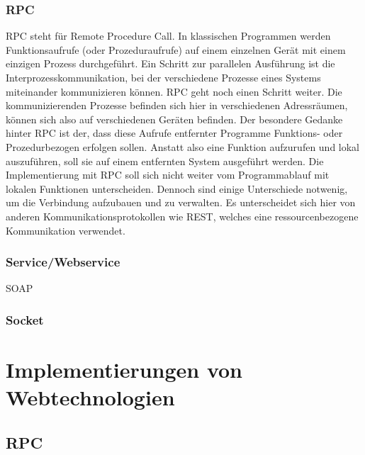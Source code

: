 \documentclass[a4paper,10pt]{article}
\numberwithin{figure}{section}
\numberwithin{table}{section}
\begin{document}
\subsubsection{RPC}

RPC steht für Remote Procedure Call.
In klassischen Programmen werden Funktionsaufrufe (oder Prozeduraufrufe) auf einem einzelnen Gerät mit einem einzigen Prozess durchgeführt.
Ein Schritt zur parallelen Ausführung ist die Interprozesskommunikation, bei der verschiedene Prozesse eines Systems miteinander kommunizieren können.
RPC geht noch einen Schritt weiter.
Die kommunizierenden Prozesse befinden sich hier in verschiedenen Adressräumen, können sich also auf verschiedenen Geräten befinden.
Der besondere Gedanke hinter RPC ist der, dass diese Aufrufe entfernter Programme Funktions- oder Prozedurbezogen erfolgen sollen.
Anstatt also eine Funktion aufzurufen und lokal auszuführen, soll sie auf einem entfernten System ausgeführt werden.
Die Implementierung mit RPC soll sich nicht weiter vom Programmablauf mit lokalen Funktionen unterscheiden.
Dennoch sind einige Unterschiede notwenig, um die Verbindung aufzubauen und zu verwalten.
Es unterscheidet sich hier von anderen Kommunikationsprotokollen wie REST, welches eine ressourcenbezogene Kommunikation verwendet.

\subsubsection{Service/Webservice}
SOAP

\subsubsection{Socket}

\newpage













\section{Implementierungen von Webtechnologien}

\subsection{RPC}
\end{document}
